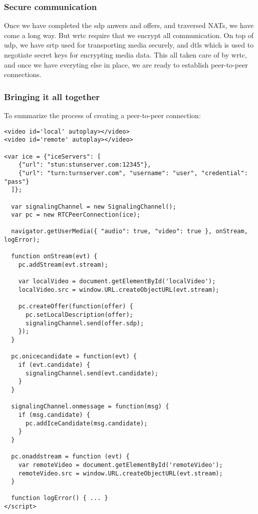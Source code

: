 \subsubsection{Secure communication}
Once we have completed the \gls{sdp} anwers and offers, and traversed NATs, we have come a long way. But \gls{wrtc} require that we encrypt all communication. On top of \gls{udp}, we have \gls{srtp} used for transporting media securely, and \gls{dtls} which is used to negotiate secret keys for encrypting media data. This all taken care of by \gls{wrtc}, and once we have everyting else in place, we are ready to establish peer-to-peer connections.

\subsubsection{Bringing it all together}
To summarize the process of creating a peer-to-peer connection:

\begin{lstlisting}
<video id='local' autoplay></video>
<video id='remote' autoplay></video>

<var ice = {"iceServers": [
    {"url": "stun:stunserver.com:12345"},
    {"url": "turn:turnserver.com", "username": "user", "credential": "pass"}
  ]};

  var signalingChannel = new SignalingChannel();
  var pc = new RTCPeerConnection(ice);

  navigator.getUserMedia({ "audio": true, "video": true }, onStream, logError);

  function onStream(evt) {
    pc.addStream(evt.stream);

    var localVideo = document.getElementById('localVideo');
    localVideo.src = window.URL.createObjectURL(evt.stream);

    pc.createOffer(function(offer) {
      pc.setLocalDescription(offer);
      signalingChannel.send(offer.sdp);
    });
  }

  pc.onicecandidate = function(evt) {
    if (evt.candidate) {
      signalingChannel.send(evt.candidate);
    }
  }

  signalingChannel.onmessage = function(msg) {
    if (msg.candidate) {
      pc.addIceCandidate(msg.candidate);
    }
  }

  pc.onaddstream = function (evt) {
    var remoteVideo = document.getElementById('remoteVideo');
    remoteVideo.src = window.URL.createObjectURL(evt.stream);
  }

  function logError() { ... }
</script>
\end{lstlisting}

